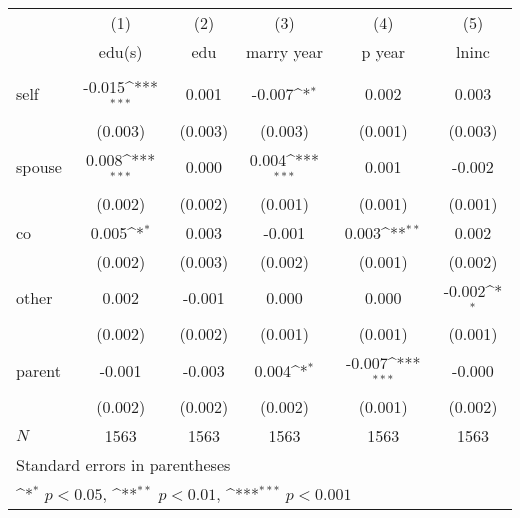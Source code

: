 \documentclass{article}
\begin{document}
{
\def\sym#1{\ifmmode^{#1}\else\(^{#1}\)\fi}
\begin{tabular}{l*{5}{c}}
\hline\hline
            &\multicolumn{1}{c}{(1)}&\multicolumn{1}{c}{(2)}&\multicolumn{1}{c}{(3)}&\multicolumn{1}{c}{(4)}&\multicolumn{1}{c}{(5)}\\
            &\multicolumn{1}{c}{edu(s)} &\multicolumn{1}{c}{edu} &\multicolumn{1}{c}{marry year} &\multicolumn{1}{c}{p year} &\multicolumn{1}{c}{lninc} \\
\hline
    &                     &                     &                     &                     &                     \\
self  &      -0.015\sym{***}&       0.001         &      -0.007\sym{*}  &       0.002         &       0.003         \\
            &     (0.003)         &     (0.003)         &     (0.003)         &     (0.001)         &     (0.003)         \\
[1em]
spouse  &       0.008\sym{***}&       0.000         &       0.004\sym{***}&       0.001         &      -0.002         \\
            &     (0.002)         &     (0.002)         &     (0.001)         &     (0.001)         &     (0.001)         \\
[1em]
co  &       0.005\sym{*}  &       0.003         &      -0.001         &       0.003\sym{**} &       0.002         \\
            &     (0.002)         &     (0.003)         &     (0.002)         &     (0.001)         &     (0.002)         \\
[1em]
other  &       0.002         &      -0.001         &       0.000         &       0.000         &      -0.002\sym{*}  \\
            &     (0.002)         &     (0.002)         &     (0.001)         &     (0.001)         &     (0.001)         \\
[1em]
parent  &      -0.001         &      -0.003         &       0.004\sym{*}  &      -0.007\sym{***}&      -0.000         \\
            &     (0.002)         &     (0.002)         &     (0.002)         &     (0.001)         &     (0.002)         \\
\hline
\(N\)       &        1563         &        1563         &        1563         &        1563         &        1563         \\
\hline\hline
\multicolumn{6}{l}{\footnotesize Standard errors in parentheses}\\
\multicolumn{6}{l}{\footnotesize \sym{*} \(p<0.05\), \sym{**} \(p<0.01\), \sym{***} \(p<0.001\)}\\
\end{tabular}
}
\end{document}
